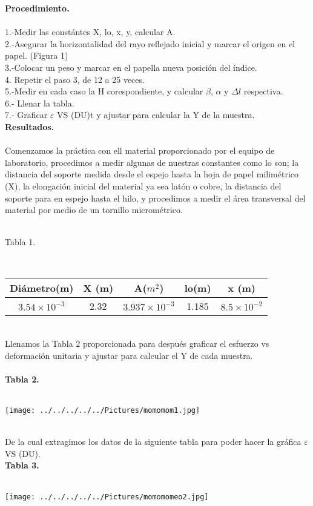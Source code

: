 \documentclass[10pt,a4paper]{article}
\begin{document}
\textbf{Procedimiento.}\\
\\
1.-Medir las const\'{a}ntes X, lo, x, y, calcular A.\\
2.-Asegurar la horizontalidad del rayo reflejado inicial y marcar el origen en el papel. (Figura 1)\\
3.-Colocar un peso y marcar en el papella nueva posici\'{o}n del \'{i}ndice. \\
4. Repetir el paso 3, de 12 a 25 veces.\\
5.-Medir en cada caso la H corespondiente, y calcular $\beta$, $\alpha$ y $\Delta l$ respectiva.\\
6.- Llenar la tabla.\\
7.- Graficar $\varepsilon$ VS (DU)t y ajustar para calcular la Y de la muestra.\\

\textbf{Resultados.}\\
\\
Comenzamos la pr\'{a}ctica con ell material proporcionado por el equipo de laboratorio, procedimos a medir algunas de nuestras constantes como lo son; la distancia del soporte medida desde el espejo hasta la hoja de papel milim\'{e}trico (X), la elongaci\'{o}n inicial del material ya sea lat\'{o}n o cobre, la distancia del soporte para en espejo hasta el hilo, y procedimos a medir el \'{a}rea transversal del material por medio de un tornillo microm\'{e}trico. \\
\medskip
\\
\medskip
\caption{Tabla 1.} 
\\ 
\begin{tabular}{|c|c|c|c|c|}
\hline 
Di\'{a}metro(m) & X (m) & A(${ m }^{ 2 }$) & lo(m)& x (m)\\ 
\hline 
${ 3.54\times 10 }^{ -3 }$ & 2.32 & ${ 3.937\times 10 }^{ -3 }$ & 1.185 &${ 8.5\times 10 }^{ -2 }$ \\
\hline 
\end{tabular}\\

\medskip
Llenamos la Tabla 2 proporcionada para despu\'{e}s graficar el esfuerzo vs deformaci\'{o}n unitaria y ajustar para calcular el Y de cada muestra.\\
\\
\textbf{Tabla 2.}\\
\\
\begin{figure 2}
\centering
\texttt{[image: ../../../../../Pictures/momomom1.jpg]} 
\\
\end{figure 2}
\\
De la cual extragimos los datos de la siguiente tabla para poder hacer la gr\'{a}fica $\varepsilon$ VS (DU).
\\
\textbf{Tabla 3.}\\
\\
\begin{figure 3}
\centering
\texttt{[image: ../../../../../Pictures/momomomeo2.jpg]} 
\\
\end{figure 3}
\\
\end{document}
